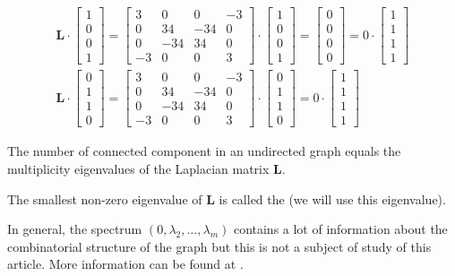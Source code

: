 \documentclass[a4paper]{article}
\begin{document}
\[
\begin{split}
\textbf{L}\cdot 
\begin{bmatrix}
1\\0\\0\\1
\end{bmatrix}=
\begin{bmatrix}
3 & 0& 0& -3\\
0 & 34& -34& 0\\
0 & -34& 34& 0\\
-3 & 0& 0& 3
\end{bmatrix}
\cdot
\begin{bmatrix}
1\\0\\0\\1
\end{bmatrix}=
\begin{bmatrix}
0\\0\\0\\0
\end{bmatrix}
=
0 \cdot 
\begin{bmatrix}
1\\1\\1\\1
\end{bmatrix}
\\
\textbf{L}\cdot 
\begin{bmatrix}
0\\1\\1\\0
\end{bmatrix}=
\begin{bmatrix}
3 & 0& 0& -3\\
0 & 34& -34& 0\\
0 & -34& 34& 0\\
-3 & 0& 0& 3
\end{bmatrix}
\cdot
\begin{bmatrix}
0\\1\\1\\0
\end{bmatrix}=
0 \cdot 
\begin{bmatrix}
1\\1\\1\\1
\end{bmatrix}
\end{split}
\]
\begin{corollary}
The number of connected component in an undirected graph equals the multiplicity eigenvalues of the Laplacian matrix \textbf{L}.
\end{corollary}
\begin{definition}
The smallest non-zero eigenvalue of \textbf{L} is called the  (we will use this eigenvalue).
\end{definition}
In general, the spectrum $(0,\lambda_2, \ldots , \lambda_m)$ contains a lot of information about the combinatorial structure of the graph but this is not a subject of study of this article. More information can be found at \TODO[ref].
\end{document}
